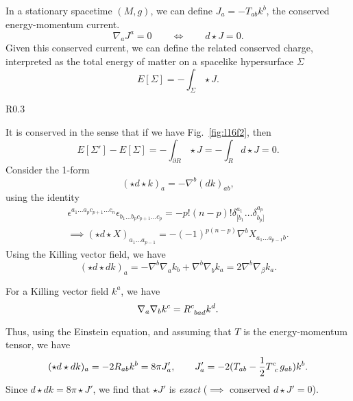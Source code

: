 In a stationary spacetime $(M, g)$, we can define $J_a = - T_{ab} k^{b}$, the conserved energy-momentum current.
\begin{equation}
  \nabla_a J^{a} = 0 \qquad \iff \qquad d \star J = 0.
\end{equation}
Given this conserved current, we can define the related conserved charge, interpreted as the total energy of matter on a spacelike hypersurface $\Sigma$
\begin{equation}
  E[\Sigma] = -\int_\Sigma \star J.
\end{equation}
\begin{wrapfigure}{R}{0.3\columnwidth}
  \centering
  \caption{}
  \label{fig:l16f2}
\end{wrapfigure}
It is conserved in the sense that if we have Fig.~\ref{fig:l16f2}, then 
\begin{equation}
  E[\Sigma'] - E[\Sigma] = - \int_{\partial R} \star J = -\int_R d \star J  = 0.
\end{equation}
Consider the 1-form
\begin{equation}
  (\star d \star k)_a = - \nabla^{b} (d k)_{ab},
\end{equation}
using the identity
\begin{multline}
  \epsilon^{a_1 \dots a_p c_{p+1} \dots c_{n}} \epsilon_{b_1 \dots b_p c_{p+1} \dots c_p} = -p! (n-p)! \delta^{a_1}_{[b_1} \dots \delta^{a_p}_{b_p]} \\
  \implies (\star d \star X)_{a_1 \dots a_{p-1}} = -(-1)^{p (n-p)} \nabla^{b} X_{a_1 \dots a_{p-1} b}.
\end{multline}
Using the Killing vector field, we have
\begin{equation}
  (\star d \star d k)_a = -\nabla^{b} \nabla_{a} k_b + \nabla^{b} \nabla_{b} k_a = 2 \nabla^{b} \nabla_{\beta} k_a.
\end{equation}
\begin{lemma}
  For a Killing vector field $k^{a}$, we have 
  \begin{equation}
    \nabla_a \nabla_b k^{c} = R\indices{^{c}_{bad}} k^{d}.
  \end{equation}
\end{lemma}
Thus, using the Einstein equation, and assuming that $T$ is the energy-momentum tensor, we have
\begin{equation}
  (\star d \star d k)_a = -2 R_{ab} k^{b} = 8 \pi J'_a, \qquad J'_a = -2 (T_{ab} - \frac{1}{2} T\indices{^{c}_{c}} g_{ab}) k^{b}.
\end{equation}
Since $d \star d k = 8 \pi \star J'$, we find that $\star J'$ is \emph{exact} ($\implies $ conserved $d \star J' =0$).
